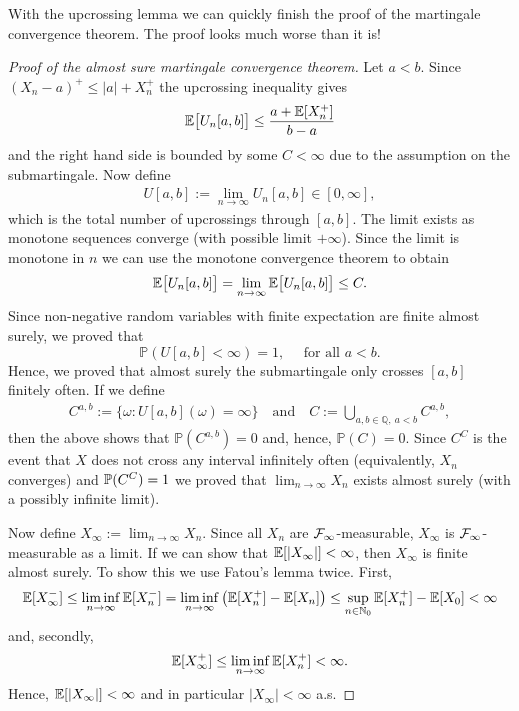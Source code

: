 With the upcrossing lemma we can quickly finish the proof of the martingale convergence theorem. The proof looks much worse than it is!
\begin{proof}[Proof of the almost sure martingale convergence theorem]
	Let $a<b$. Since $(X_n-a)^+ \leq \lvert a \rvert + X_n^+$ the upcrossing inequality gives $$ \E\big[ U_n[a,b]\big] \leq \frac{a+\E[X_n^+]}{b-a}$$
	and the right hand side is bounded by some $C<\infty$ due to the assumption on the submartingale. Now define
	\begin{align*}
		U[a,b]:=\lim_{n\to\infty} U_n[a,b]\in [0,\infty],
	\end{align*}	
	which is the total number of upcrossings through $[a,b]$. The limit exists as monotone sequences converge (with possible limit $+\infty$). Since the limit is monotone in $n$ we can use the monotone convergence theorem to obtain
	\begin{align*}
		\E\big[ U_n[a,b]\big] = \lim_{n\to \infty}\E\big[U_n[a,b]\big] \leq C.
	\end{align*}
	Since non-negative random variables with finite expectation are finite almost surely, we proved that $$\mathbb{P}(U[a,b]< \infty )=1,\quad \text{ for all }a<b.$$ Hence, we proved that almost surely the submartingale only crosses $[a,b]$ finitely often. If we define
	\begin{align*}
		C^{a,b} := \lbrace \omega: U[a,b](\omega) = \infty \rbrace \quad \text{and}\quad
		C := \bigcup_{a,b\in\mathbb{Q},\: a<b}C^{a,b},
	\end{align*}
	then the above shows that $\mathbb{P}(C^{a,b}) = 0$ and, hence, $\mathbb{P}(C)=0$. Since $C^C$ is the event that $X$ does not cross any interval infinitely often (equivalently, $X_n$ converges) and $\P(C^C)=1$ we proved that $\lim_{n\to\infty} X_n$ exists almost surely (with a possibly infinite limit).\smallskip
	
	Now define $X_\infty:=\lim_{n\to\infty} X_n$. Since all $X_n$ are $\cF_{\infty}$-measurable, $X_{\infty}$ is $\cF_{\infty}$-measurable as a limit. If we can show that $\E[|X_\infty|]<\infty$, then $X_\infty$ is finite almost surely. To show this we use Fatou's lemma twice. First, 
	\begin{align*}
		\E[X_{\infty}^-] \leq \liminf_{n\to\infty} \E[X_n^-] 
								= \liminf_{n\to\infty} \big( \E[X_n^+]-\E[X_n]\big) 
								\leq \sup_{n\in\N_0} \E[X_n^+] - \E[X_0] < \infty
	\end{align*}
	and, secondly,
	\begin{align*}
		\E[X_{\infty}^+] \leq \liminf_{n\to\infty} \E[X_n^+] <\infty.
	\end{align*}
	Hence, $\E[\lvert X_{\infty}\rvert ] < \infty$ and in particular $\lvert X_{\infty} \rvert < \infty$ a.s.
\end{proof}
